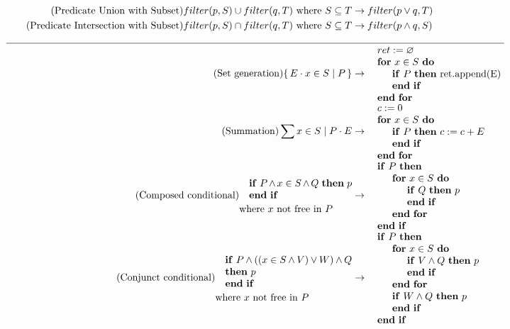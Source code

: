 \documentclass{article}
\newcommand{\bSet}[3]{%
  \{\, #1 \cdot #2 \mid #3 \, \}%
}
\begin{document}
\begin{align}
  \\
  \tag{Predicate Union with Subset}
  filter(p, S) \cup filter(q, T) \text{ where } S \subseteq T &\rightarrow filter(p \lor q, T)
  \\
  \tag{Predicate Intersection with Subset}
  filter(p, S) \cap filter(q, T) \text{ where } S \subseteq T &\rightarrow filter(p \land q, S)
  \\
  \cline{1-2}
  \tag{Set generation}
  \bSet{E}{x \in S}{P}
  &\rightarrow
  \begin{minipage}[]{0.4\textwidth}
  \begin{algorithmic}
  \State $ret := \emptyset$
  \For{$x \in S$}
      \If{$P$} %
          ret.append(E)
      \EndIf
  \EndFor
  \end{algorithmic}
  \end{minipage}
  \\
  \tag{Summation}
  \sum x \in S \mid P \cdot E
  &\rightarrow
  \begin{minipage}[]{0.4\textwidth}
  \begin{algorithmic}
  \State $c := 0$
  \For{$x \in S$}
      \If{$P$} %
          $c := c + E$
      \EndIf
  \EndFor
  \end{algorithmic}
  \end{minipage}
  \\
  \tag{Composed conditional}
  \begin{minipage}[]{0.33\textwidth}
  \begin{algorithmic}
      \If{$P \land x \in S \land Q$}
          $p$
      \EndIf
  \end{algorithmic}
  where $x$ not free in $P$
  \end{minipage}
  & \rightarrow
  \begin{minipage}[]{0.27\textwidth}
  \begin{algorithmic}
  \If{$P$}
      \For{$x \in S$}
          \If{$Q$}
              $p$
          \EndIf
      \EndFor
  \EndIf
  \end{algorithmic}
  \end{minipage}
  \\
  \tag{Conjunct conditional}
  \begin{minipage}[]{0.4\textwidth}
  \begin{algorithmic}
      \If{$P \land ((x \in S \land V) \lor W) \land Q$}
          $p$
      \EndIf
  \end{algorithmic}
  where $x$ not free in $P$
  \end{minipage}
  & \rightarrow
  \begin{minipage}[]{0.4\textwidth}
  \begin{algorithmic}
  \If{$P$}
      \For{$x \in S$}
          \If{$V \land Q$}
              $p$
          \EndIf
      \EndFor
      \If{$W \land Q$}
        $p$
      \EndIf
  \EndIf
  \end{algorithmic}
  \end{minipage}
\end{align}
\end{document}
